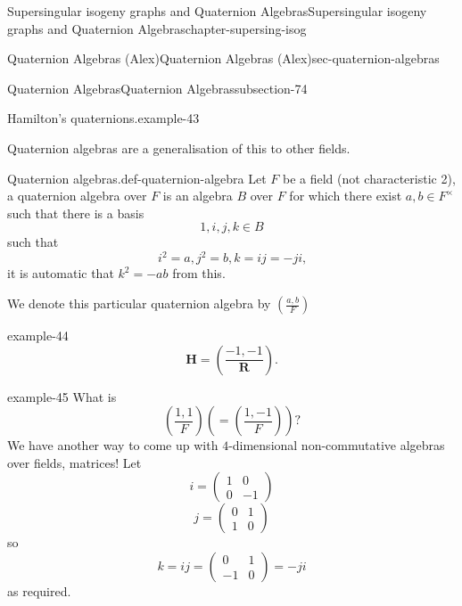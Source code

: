 \documentclass[oneside,10pt,]{book}
\numberwithin{equation}{section}
\newcommand{\legendre}[2]{\left(\frac{#1}{#2}\right)}
\newcommand{\RR}{\mathbf{R}}
\newcommand{\HH}{\mathbf{H}}
\newcommand{\amp}{&}
\begin{document}
\begin{chapterptx}{Supersingular isogeny graphs and Quaternion Algebras}{}{Supersingular isogeny graphs and Quaternion Algebras}{}{}{chapter-supersing-isog}
\begin{sectionptx}{Quaternion Algebras (Alex)}{}{Quaternion Algebras (Alex)}{}{}{sec-quaternion-algebras}
\begin{subsectionptx}{Quaternion Algebras}{}{Quaternion Algebras}{}{}{subsection-74}
\begin{introduction}{}
\begin{example}{Hamilton's quaternions.}{example-43}
\end{example}
\hypertarget{p-888}{}%
Quaternion algebras are a generalisation of this to other fields.%
\begin{definition}{Quaternion algebras.}{def-quaternion-algebra}%
\hypertarget{p-889}{}%
Let \(F\) be a field (not characteristic 2), a quaternion algebra over \(F\) is an algebra \(B\) over \(F\) for which there exist \(a,b\in F^\times\) such that there is a basis%
\begin{equation*}
1,i,j,k \in B
\end{equation*}
such that%
\begin{equation*}
i^2 = a,j^2=b,k=ij=-ji\text{,}
\end{equation*}
it is automatic that \(k^2 = -ab\) from this.%
\par
\hypertarget{p-890}{}%
We denote this particular quaternion algebra by \(\legendre{a,b}{F}\)%
\end{definition}
\begin{example}{}{example-44}%
\hypertarget{p-891}{}%
%
\begin{equation*}
\HH = \legendre{-1,-1}{\RR}\text{.}
\end{equation*}
%
\end{example}
\begin{example}{}{example-45}%
\hypertarget{p-892}{}%
What is%
\begin{equation*}
\legendre{1,1}{F} \left( = \legendre{1,-1}{F}\right)\text{?}
\end{equation*}
We have another way to come up with \(4\)-dimensional non-commutative algebras over fields, matrices! Let%
\begin{equation*}
i=  \begin{pmatrix} 1\amp0\\0\amp -1\end{pmatrix}
\end{equation*}
%
\begin{equation*}
j =\begin{pmatrix} 0\amp1\\1\amp 0\end{pmatrix}
\end{equation*}
so%
\begin{equation*}
k = ij = \begin{pmatrix} 0\amp1\\-1\amp 0\end{pmatrix} = -ji
\end{equation*}
as required.%
\end{example}

\end{introduction}
\end{subsectionptx}
\end{sectionptx}
\end{chapterptx}
\end{document}
